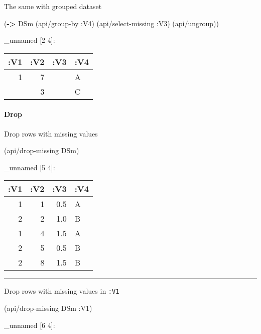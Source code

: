 \documentclass[]{article}
\newenvironment{Shaded}{\begin{snugshade}}{\end{snugshade}}
\newcommand{\KeywordTok}[1]{\textcolor[rgb]{0.13,0.29,0.53}{\textbf{#1}}}
\newcommand{\AttributeTok}[1]{\textcolor[rgb]{0.77,0.63,0.00}{#1}}
\newcommand{\NormalTok}[1]{#1}
\let\oldparagraph\paragraph
\renewcommand{\paragraph}[1]{\oldparagraph{#1}\mbox{}}
\begin{document}
The same with grouped dataset

\begin{Shaded}
\begin{Highlighting}[]
\NormalTok{(}\KeywordTok{->}\NormalTok{ DSm}
\NormalTok{    (api/group-by }\AttributeTok{:V4}\NormalTok{)}
\NormalTok{    (api/select-missing }\AttributeTok{:V3}\NormalTok{)}
\NormalTok{    (api/ungroup))}
\end{Highlighting}
\end{Shaded}

\_unnamed {[}2 4{]}:

\begin{longtable}[]{@{}rrrl@{}}
\toprule
:V1 & :V2 & :V3 & :V4\tabularnewline
\midrule
\endhead
1 & 7 & & A\tabularnewline
& 3 & & C\tabularnewline
\bottomrule
\end{longtable}

\paragraph{Drop}\label{drop-2}

Drop rows with missing values

\begin{Shaded}
\begin{Highlighting}[]
\NormalTok{(api/drop-missing DSm)}
\end{Highlighting}
\end{Shaded}

\_unnamed {[}5 4{]}:

\begin{longtable}[]{@{}rrrl@{}}
\toprule
:V1 & :V2 & :V3 & :V4\tabularnewline
\midrule
\endhead
1 & 1 & 0.5 & A\tabularnewline
2 & 2 & 1.0 & B\tabularnewline
1 & 4 & 1.5 & A\tabularnewline
2 & 5 & 0.5 & B\tabularnewline
2 & 8 & 1.5 & B\tabularnewline
\bottomrule
\end{longtable}

\begin{center}\rule{0.5\linewidth}{0.5pt}\end{center}

Drop rows with missing values in \texttt{:V1}

\begin{Shaded}
\begin{Highlighting}[]
\NormalTok{(api/drop-missing DSm }\AttributeTok{:V1}\NormalTok{)}
\end{Highlighting}
\end{Shaded}

\_unnamed {[}6 4{]}:
\end{document}
